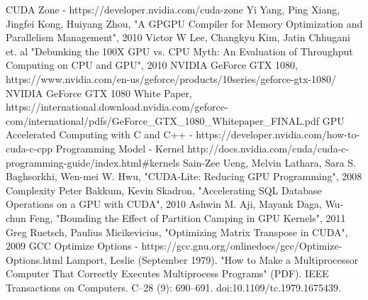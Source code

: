\documentclass[conference]{IEEEtran}
\begin{document}
\begin{thebibliography}{00}
 CUDA Zone - https://developer.nvidia.com/cuda-zone
 Yi Yang, Ping Xiang, Jingfei Kong, Huiyang Zhou, "A GPGPU Compiler for Memory Optimization and Parallelism Management", 2010
 Victor W Lee, Changkyu Kim, Jatin Chhugani et. al "Debunking the 100X GPU vs. CPU Myth: An Evaluation of Throughput Computing on CPU and GPU", 2010
 NVIDIA GeForce GTX 1080, https://www.nvidia.com/en-us/geforce/products/10series/geforce-gtx-1080/
 NVIDIA GeForce GTX 1080 White Paper,
https://international.download.nvidia.com/geforce-com/international/pdfs/GeForce\_GTX\_1080\_Whitepaper\_FINAL.pdf
 GPU Accelerated Computing with C and C++ - https://developer.nvidia.com/how-to-cuda-c-cpp
 Programming Model - Kernel http://docs.nvidia.com/cuda/cuda-c-programming-guide/index.html\#kernels
 Sain-Zee Ueng, Melvin Lathara, Sara S. Baghsorkhi, Wen-mei W. Hwu, "CUDA-Lite: Reducing GPU Programming", 2008
Complexity
 Peter Bakkum, Kevin Skadron, "Accelerating SQL Database Operations on a GPU with CUDA", 2010
 Ashwin M. Aji, Mayank Daga, Wu-chun Feng, "Bounding the Effect of Partition Camping in GPU Kernels", 2011
 Greg Ruetsch, Paulius Micikevicius, "Optimizing Matrix Transpose in CUDA", 2009 
 GCC Optimize Options - https://gcc.gnu.org/onlinedocs/gcc/Optimize-Options.html
  Lamport, Leslie (September 1979). "How to Make a Multiprocessor Computer That Correctly Executes Multiprocess Programs" (PDF). IEEE Transactions on Computers. C–28 (9): 690–691. doi:10.1109/tc.1979.1675439.



\end{thebibliography}
\end{document}
